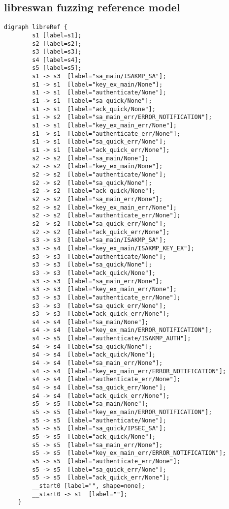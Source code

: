 \begin{appendices}
\subsection*{libreswan fuzzing reference model}
\begin{lstlisting}[numbers=none]
	digraph libreRef {
		s1 [label=s1];
		s2 [label=s2];
		s3 [label=s3];
		s4 [label=s4];
		s5 [label=s5];
		s1 -> s3  [label="sa_main/ISAKMP_SA"];
		s1 -> s1  [label="key_ex_main/None"];
		s1 -> s1  [label="authenticate/None"];
		s1 -> s1  [label="sa_quick/None"];
		s1 -> s1  [label="ack_quick/None"];
		s1 -> s2  [label="sa_main_err/ERROR_NOTIFICATION"];
		s1 -> s1  [label="key_ex_main_err/None"];
		s1 -> s1  [label="authenticate_err/None"];
		s1 -> s1  [label="sa_quick_err/None"];
		s1 -> s1  [label="ack_quick_err/None"];
		s2 -> s2  [label="sa_main/None"];
		s2 -> s2  [label="key_ex_main/None"];
		s2 -> s2  [label="authenticate/None"];
		s2 -> s2  [label="sa_quick/None"];
		s2 -> s2  [label="ack_quick/None"];
		s2 -> s2  [label="sa_main_err/None"];
		s2 -> s2  [label="key_ex_main_err/None"];
		s2 -> s2  [label="authenticate_err/None"];
		s2 -> s2  [label="sa_quick_err/None"];
		s2 -> s2  [label="ack_quick_err/None"];
		s3 -> s3  [label="sa_main/ISAKMP_SA"];
		s3 -> s4  [label="key_ex_main/ISAKMP_KEY_EX"];
		s3 -> s3  [label="authenticate/None"];
		s3 -> s3  [label="sa_quick/None"];
		s3 -> s3  [label="ack_quick/None"];
		s3 -> s3  [label="sa_main_err/None"];
		s3 -> s3  [label="key_ex_main_err/None"];
		s3 -> s3  [label="authenticate_err/None"];
		s3 -> s3  [label="sa_quick_err/None"];
		s3 -> s3  [label="ack_quick_err/None"];
		s4 -> s4  [label="sa_main/None"];
		s4 -> s4  [label="key_ex_main/ERROR_NOTIFICATION"];
		s4 -> s5  [label="authenticate/ISAKMP_AUTH"];
		s4 -> s4  [label="sa_quick/None"];
		s4 -> s4  [label="ack_quick/None"];
		s4 -> s4  [label="sa_main_err/None"];
		s4 -> s4  [label="key_ex_main_err/ERROR_NOTIFICATION"];
		s4 -> s4  [label="authenticate_err/None"];
		s4 -> s4  [label="sa_quick_err/None"];
		s4 -> s4  [label="ack_quick_err/None"];
		s5 -> s5  [label="sa_main/None"];
		s5 -> s5  [label="key_ex_main/ERROR_NOTIFICATION"];
		s5 -> s5  [label="authenticate/None"];
		s5 -> s5  [label="sa_quick/IPSEC_SA"];
		s5 -> s5  [label="ack_quick/None"];
		s5 -> s5  [label="sa_main_err/None"];
		s5 -> s5  [label="key_ex_main_err/ERROR_NOTIFICATION"];
		s5 -> s5  [label="authenticate_err/None"];
		s5 -> s5  [label="sa_quick_err/None"];
		s5 -> s5  [label="ack_quick_err/None"];
		__start0 [label="", shape=none];
		__start0 -> s1  [label=""];
	}
\end{lstlisting}
\end{appendices}
\cleardoublepage
